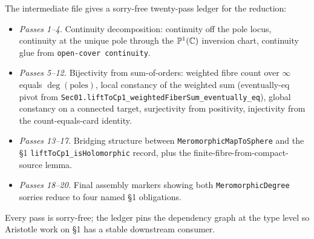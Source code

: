 The intermediate file
gives a sorry-free twenty-pass ledger for the reduction:

\begin{itemize}
\item \emph{Passes 1--4.} Continuity decomposition: continuity off the
  pole locus, continuity at the unique pole through the \(\mathbb{P}^{1}(\mathbb{C})\)
  inversion chart, continuity glue from \texttt{open-cover continuity}.
\item \emph{Passes 5--12.} Bijectivity from sum-of-orders: weighted fibre
  count over \(\infty\) equals \(\deg(\text{poles})\), local constancy of
  the weighted sum (eventually-eq pivot from
  \texttt{Sec01.liftToCp1\_weightedFiberSum\_eventually\_eq}), global
  constancy on a connected target, surjectivity from positivity,
  injectivity from the count-equals-card identity.
\item \emph{Passes 13--17.} Bridging structure between
  \texttt{MeromorphicMapToSphere} and the \S 1
  \texttt{liftToCp1\_isHolomorphic} record, plus the
  finite-fibre-from-compact-source lemma.
\item \emph{Passes 18--20.} Final assembly markers showing both
  \texttt{MeromorphicDegree} sorries reduce to four named \S 1
  obligations.
\end{itemize}

Every pass is sorry-free; the ledger pins the dependency graph at the
type level so Aristotle work on \S 1 has a stable downstream consumer.
